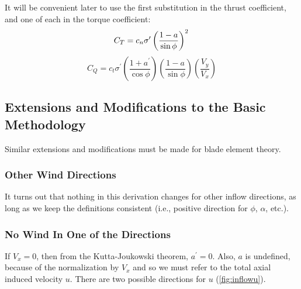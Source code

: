 \documentclass{article}
\begin{document}
It will be convenient later to use the first substitution in the thrust coefficient, and one of each in the torque coefficient:
\begin{equation}
    C_T = c_n \sigma^\prime \left(\frac{1-a}{\sin\phi}\right)^2\\
    \label{eq:CTbe}
\end{equation}
\begin{equation}
    C_Q = c_t \sigma^\prime \left(\frac{1 + a^\prime}{\cos\phi}\right)\left(\frac{1 - a}{\sin\phi}\right)\left(\frac{V_y}{V_x}\right)
    \label{eq:CQbe}
\end{equation}

\subsection{Extensions and Modifications to the Basic Methodology}

Similar extensions and modifications must be made for blade element theory.

\subsubsection{Other Wind Directions}

It turns out that nothing in this derivation changes for other inflow directions, as long as we keep the definitions consistent (i.e., positive direction for $\phi$, $\alpha$, etc.).


\subsubsection{No Wind In One of the Directions}
\label{sec:nowindtan}

If $V_x = 0$, then from the Kutta-Joukowski theorem, $a^\prime = 0$.  Also, $a$ is undefined, because of the normalization by $V_x$ and so we must refer to the total axial induced velocity $u$.  There are two possible directions for $u$ (\cref{fig:inflowu}).
\end{document}

